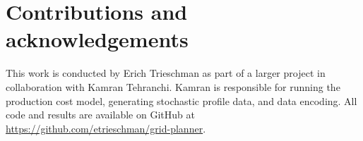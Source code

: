 \documentclass[10pt,twocolumn,letterpaper]{article}
\begin{document}
\section{Contributions and acknowledgements}
\label{sec:contrib}
This work is conducted by Erich Trieschman as part of a larger project in collaboration with Kamran Tehranchi. Kamran is responsible for running the production cost model, generating stochastic profile data, and data encoding. All code and results are available on GitHub at \url{https://github.com/etrieschman/grid-planner}.

{\small


}
\end{document}
